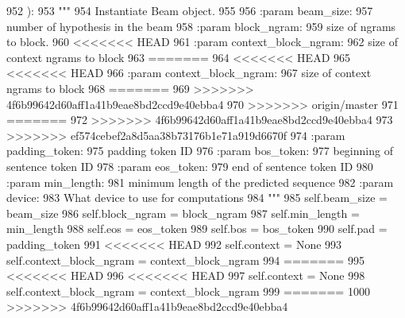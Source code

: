 \begin{DoxyCode}
952     ):
953         \textcolor{stringliteral}{"""}
954 \textcolor{stringliteral}{        Instantiate Beam object.}
955 \textcolor{stringliteral}{}
956 \textcolor{stringliteral}{        :param beam\_size:}
957 \textcolor{stringliteral}{            number of hypothesis in the beam}
958 \textcolor{stringliteral}{        :param block\_ngram:}
959 \textcolor{stringliteral}{            size of ngrams to block.}
960 \textcolor{stringliteral}{<<<<<<< HEAD}
961 \textcolor{stringliteral}{        :param context\_block\_ngram:}
962 \textcolor{stringliteral}{            size of context ngrams to block}
963 \textcolor{stringliteral}{=======}
964 \textcolor{stringliteral}{<<<<<<< HEAD}
965 \textcolor{stringliteral}{<<<<<<< HEAD}
966 \textcolor{stringliteral}{        :param context\_block\_ngram:}
967 \textcolor{stringliteral}{            size of context ngrams to block}
968 \textcolor{stringliteral}{=======}
969 \textcolor{stringliteral}{>>>>>>> 4f6b99642d60aff1a41b9eae8bd2ccd9e40ebba4}
970 \textcolor{stringliteral}{>>>>>>> origin/master}
971 \textcolor{stringliteral}{=======}
972 \textcolor{stringliteral}{>>>>>>> 4f6b99642d60aff1a41b9eae8bd2ccd9e40ebba4}
973 \textcolor{stringliteral}{>>>>>>> ef574cebef2a8d5aa38b73176b1e71a919d6670f}
974 \textcolor{stringliteral}{        :param padding\_token:}
975 \textcolor{stringliteral}{            padding token ID}
976 \textcolor{stringliteral}{        :param bos\_token:}
977 \textcolor{stringliteral}{            beginning of sentence token ID}
978 \textcolor{stringliteral}{        :param eos\_token:}
979 \textcolor{stringliteral}{            end of sentence token ID}
980 \textcolor{stringliteral}{        :param min\_length:}
981 \textcolor{stringliteral}{            minimum length of the predicted sequence}
982 \textcolor{stringliteral}{        :param device:}
983 \textcolor{stringliteral}{            What device to use for computations}
984 \textcolor{stringliteral}{        """}
985         self.beam\_size = beam\_size
986         self.block\_ngram = block\_ngram
987         self.min\_length = min\_length
988         self.eos = eos\_token
989         self.bos = bos\_token
990         self.pad = padding\_token
991 <<<<<<< HEAD
992         self.context = \textcolor{keywordtype}{None}
993         self.context\_block\_ngram = context\_block\_ngram
994 =======
995 <<<<<<< HEAD
996 <<<<<<< HEAD
997         self.context = \textcolor{keywordtype}{None}
998         self.context\_block\_ngram = context\_block\_ngram
999 =======
1000 >>>>>>> 4f6b99642d60aff1a41b9eae8bd2ccd9e40ebba4

\end{DoxyCode}

